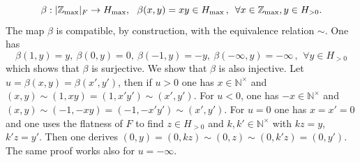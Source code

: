 \documentclass[noams,lp]{compositio}
\def\N{{\mathbb N}}
\def\Z{{\mathbb Z}}
\def\qqq{\,,\,~\forall}
\def\zmax{{\Z_{\rm max}}}
\def\nt{\N^{\times}}
\begin{document}
\begin{equation}\label{mapbeta}
\beta:|\zmax|_F\to H_{\rm max}, \  \ \beta(x,y)=xy\in H_{\rm max}\qqq x\in \zmax, y\in H_{>0}.
\end{equation}
The map $\beta$ is compatible, by construction, with the equivalence relation $\sim$. One has 
$$
\beta(1,y)=y, \ \beta(0,y)=0, \ \beta(-1,y)=-y, \ \beta(-\infty,y)=-\infty\qqq y\in H_{>0}
$$
which shows that $\beta$ is surjective. We show that $\beta$ is also injective. Let $u=\beta(x,y)=\beta(x',y')$, then if $u>0$ one has $x\in \nt$ and $(x,y)\sim (1,xy)=(1,x'y')\sim (x',y')$. For $u<0$, one has 
$-x\in \nt$ and $(x,y)\sim (-1,-xy)=(-1,-x'y')\sim (x',y')$. For $u=0$ one has $x=x'=0$ and one uses the flatness of $F$ to find $z\in H_{>0}$ and $k,k'\in \nt$ with $kz=y$, $k'z=y'$. Then one derives
$(0,y)= (0,kz)\sim (0,z)\sim (0,k'z)=(0,y')$. The same proof works also for $u=-\infty$.
\end{document}

